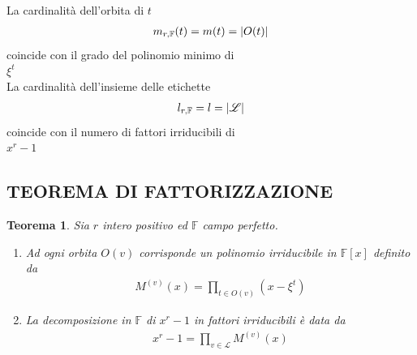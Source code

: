\documentclass[mathserif]{beamer}
\newtheorem{teorema}{Teorema}
\begin{document}
\begin{frame}
   \begin{center}
      La cardinalità dell'orbita di $t$
        \begin{align*}
	  m_{r,\mathbb{F}}(t) = m(t) = \arrowvert O(t) \arrowvert
	\end{align*}
      coincide con il grado del polinomio minimo di \\
     $\xi^{t}$
     \vspace{0.5cm}
     \\
      La cardinalità dell'insieme delle etichette
 	\begin{align*}
	   l_{r,\mathbb{F}} = l = \arrowvert \mathscr{L} \arrowvert
	\end{align*}
     coincide con il numero di fattori irriducibili di \\
     $x^r-1$
    \end{center}
\end{frame}

\subsection{TEOREMA DI FATTORIZZAZIONE}
\begin{frame}
    \begin{teorema}
      Sia $r$ intero positivo ed $\mathbb{F}$ campo perfetto.
      \begin{enumerate}
	  \item Ad ogni orbita $O(v)$ corrisponde un polinomio irriducibile in $\mathbb{F}[x]$ definito da
		\begin{align*}
		  M^{(v)}(x) =  \prod_{t \in O(v)} (x- \xi^t)
		\end{align*}
	  \item La decomposizione in $\mathbb{F}$ di $x^r - 1$ in fattori irriducibili è data da
		\begin{align*}
		  x^r - 1 = \prod_{v \in \mathscr{L} } M^{(v)}(x)
		\end{align*}
      \end{enumerate}
    \end{teorema}
\end{frame}


\end{document}
